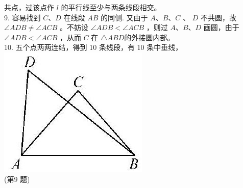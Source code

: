 \documentclass[10pt]{article}
\begin{document}
共点，过该点作 $l$ 的平行线至少与两条线段相交。\\
9. 容易找到 $C 、 D$ 在线段 $A B$ 的同侧. 又由于 $A 、 B 、 C$ 、 $D$ 不共圆，故 $\angle A D B \neq \angle A C B$ 。不妨设 $\angle A D B<\angle A C B$ ，则过 $A 、 B 、 D$ 画圆，由于 $\angle A D B<\angle A C B$ ，从而 $C$ 在 $\triangle A B D$的外接圆内部。\\
10. 五个点两两连结，得到 10 条线段，有 10 条中垂线，\\
\includegraphics[max width=\textwidth, center]{2024_10_30_66b8e5e701da2093c133g-109}\\
(第9 题)
\end{document}
